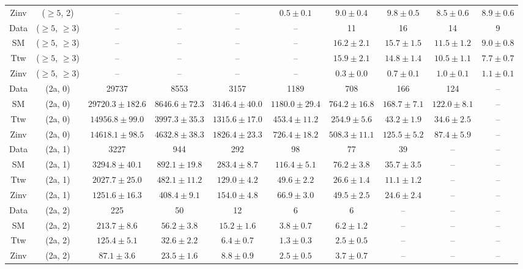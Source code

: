 \begin{table}[h!]
{\begin{tabular}{cccccccccc}
	Zinv & ($\ge5$, 2) & -- & -- & -- & $0.5\pm 0.1$ & $9.0\pm 0.4$ & $9.8\pm 0.5$ & $8.5\pm 0.6$ & $8.9\pm 0.6$ \\[0.5ex] 
	Data & ($\ge5$, $\ge3$) & -- & -- & -- & -- & 11 & 16 & 14 & 9 \\[0.5ex] 
	SM & ($\ge5$, $\ge3$) & -- & -- & -- & -- & $16.2\pm 2.1$ & $15.7\pm 1.5$ & $11.5\pm 1.2$ & $9.0\pm 0.8$ \\[0.5ex] 
	Ttw & ($\ge5$, $\ge3$) & -- & -- & -- & -- & $15.9\pm 2.1$ & $14.8\pm 1.4$ & $10.5\pm 1.1$ & $7.7\pm 0.7$ \\[0.5ex] 
	Zinv & ($\ge5$, $\ge3$) & -- & -- & -- & -- & $0.3\pm 0.0$ & $0.7\pm 0.1$ & $1.0\pm 0.1$ & $1.1\pm 0.1$ \\[0.5ex] 
	Data & (2a, 0) & 29737 & 8553 & 3157 & 1189 & 708 & 166 & 124 & -- \\[0.5ex] 
	SM & (2a, 0) & $29720.3\pm 182.6$ & $8646.6\pm 72.3$ & $3146.4\pm 40.0$ & $1180.0\pm 29.4$ & $764.2\pm 16.8$ & $168.7\pm 7.1$ & $122.0\pm 8.1$ & -- \\[0.5ex] 
	Ttw & (2a, 0) & $14956.8\pm 99.0$ & $3997.3\pm 35.3$ & $1315.6\pm 17.0$ & $453.4\pm 11.2$ & $254.9\pm 5.6$ & $43.2\pm 1.9$ & $34.6\pm 2.5$ & -- \\[0.5ex] 
	Zinv & (2a, 0) & $14618.1\pm 98.5$ & $4632.8\pm 38.3$ & $1826.4\pm 23.3$ & $726.4\pm 18.2$ & $508.3\pm 11.1$ & $125.5\pm 5.2$ & $87.4\pm 5.9$ & -- \\[0.5ex] 
	Data & (2a, 1) & 3227 & 944 & 292 & 98 & 77 & 39 & -- & -- \\[0.5ex] 
	SM & (2a, 1) & $3294.8\pm 40.1$ & $892.1\pm 19.8$ & $283.4\pm 8.7$ & $116.4\pm 5.1$ & $76.2\pm 3.8$ & $35.7\pm 3.5$ & -- & -- \\[0.5ex] 
	Ttw & (2a, 1) & $2027.7\pm 25.0$ & $482.1\pm 11.2$ & $129.0\pm 4.2$ & $49.6\pm 2.2$ & $26.6\pm 1.4$ & $11.1\pm 1.2$ & -- & -- \\[0.5ex] 
	Zinv & (2a, 1) & $1251.6\pm 16.3$ & $408.4\pm 9.1$ & $154.0\pm 4.8$ & $66.9\pm 3.0$ & $49.5\pm 2.5$ & $24.6\pm 2.4$ & -- & -- \\[0.5ex] 
	Data & (2a, 2) & 225 & 50 & 12 & 6 & 6 & -- & -- & -- \\[0.5ex] 
	SM & (2a, 2) & $213.7\pm 8.6$ & $56.2\pm 3.8$ & $15.2\pm 1.6$ & $3.8\pm 0.7$ & $6.2\pm 1.2$ & -- & -- & -- \\[0.5ex] 
	Ttw & (2a, 2) & $125.4\pm 5.1$ & $32.6\pm 2.2$ & $6.4\pm 0.7$ & $1.3\pm 0.3$ & $2.5\pm 0.5$ & -- & -- & -- \\[0.5ex] 
	Zinv & (2a, 2) & $87.1\pm 3.6$ & $23.5\pm 1.6$ & $8.8\pm 0.9$ & $2.5\pm 0.5$ & $3.7\pm 0.7$ & -- & -- & -- \\[0.5ex] 

\end{tabular}}
\end{table}
